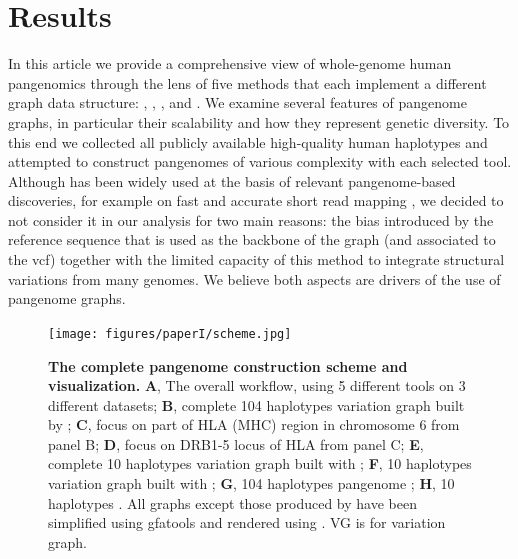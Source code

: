 \section{Results}
In this article we provide a comprehensive view of whole-genome human pangenomics through the lens of five methods that each implement a different graph data structure: \mbox{\bifrost}, \mbox{\mdbg}, \mbox{\minigraph}, \mbox{\mcactus} and \mbox{\pggb}. We examine several features of pangenome graphs, in particular their scalability and how they represent genetic diversity. To this end we collected all publicly available high-quality human haplotypes and attempted to construct pangenomes of various complexity with each selected tool.
Although \mbox{\vg} has been widely used at the basis of relevant pangenome-based discoveries, for example on fast and accurate short read mapping \mbox{\cite{giraffe}}, we decided to not consider it in our analysis for two main reasons: the bias introduced by the reference sequence that is used as the backbone of the graph (and associated to the vcf) together with the limited capacity of this method to integrate structural variations from many genomes. We believe both aspects are drivers of the use of pangenome graphs.
\begin{figure}[htp]
	\centering
	\texttt{[image: figures/paperI/scheme.jpg]}
	\caption[The complete human pangenome construction scheme and visualization.]{\textbf{The complete pangenome construction scheme and visualization.} \textbf{A}, The overall workflow, using 5 different tools on 3 different datasets; \textbf{B}, complete 104 haplotypes variation graph built by \minigraph; \textbf{C}, focus on part of HLA (MHC) region in chromosome 6 from panel B; \textbf{D}, focus on DRB1-5 locus of HLA from panel C; \textbf{E}, complete 10 haplotypes variation graph built with \pggb; \textbf{F}, 10 haplotypes variation graph built with \mcactus; \textbf{G}, 104 haplotypes pangenome \mdbg; \textbf{H}, 10 haplotypes \bifrost \dbg. All graphs except those produced by \minigraph have been simplified using gfatools and rendered using \bandage. VG is for variation graph.}
	\label{fig:figure1}
\end{figure}


